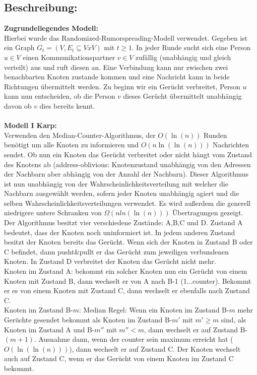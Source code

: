 \documentclass[12pt,a4paper]{report}
\begin{document}
\subsection*{Beschreibung:}
\textbf{Zugrundeliegendes Modell:}\\
 Hierbei wurde das Randomized-Rumorspreading-Modell verwendet. Gegeben ist ein Graph $G_t=(V,E_t \subseteq VxV)$ mit $t \ge 1$. In jeder Runde sucht sich eine Person $u \in V$ einen Kommunikationspartner $v \in V$ zufällig (unabhängig und gleich verteilt) aus und ruft diesen an. Eine Verbindung kann nur zwischen zwei benachbarten Knoten zustande kommen und eine Nachricht kann in beide Richtungen übermittelt werden. Zu beginn wir ein Gerücht verbreitet, Person $u$ kann nun entscheiden, ob die Person $v$ dieses Gerücht übermittelt unabhängig davon ob $v$ dies bereits kennt.\\
\\
\textbf{Modell I Karp:}\\
Verwenden den Median-Counter-Algorithmus, der $O(\ln(n))$ Runden benötigt um alle Knoten zu informieren und $O(n\ln(\ln(n)))$ Nachrichten sendet. Ob nun ein Knoten das Gerücht verbreitet oder nicht hängt vom Zustand des Knotens ab (address-oblivious: Knotenzustand unabhängig von den Adressen der Nachbarn aber abhängig von der Anzahl der Nachbarn). Dieser Algorithmus ist nun unabhängig von der Wahrscheinlichkeitsverteilung mit welcher die Nachbarn ausgewählt werden, sofern jeder Knoten unabhängig agiert und die selben Wahrscheinlichkeitsverteilungen verwendet. Es wird außerdem die generell niedrigere untere Schranken von $\Omega (n ln(\ln(n)))$ Übertragungen gezeigt. Der Algorithmus besitzt vier verschiedene Zustände: A,B,C und D. Zustand A bedeutet, dass der Knoten noch uninformiert ist. In jedem anderen Zustand besitzt der Knoten bereits das Gerücht. Wenn sich der Knoten in Zustand B oder C befindet, dann pusht\&pullt er das Gerücht zum jeweiligen verbundenen Knoten. In Zustand D verbreitet der Knoten das Gerücht nicht mehr. \\
Knoten im Zustand A:
bekommt ein solcher Knoten nun ein Gerücht von einem Knoten mit Zustand B, dann wechselt er von A nach B-1 (1...counter). Bekommt er es von einem Knoten mit Zustand C, dann wechselt er ebenfalls nach Zustand C.\\
Knoten im Zustand B-$m$: Median Regel: Wenn ein Knoten im Zustand B-$m$ mehr Gerüchte gesendet bekommt als Knoten im Zustand B-$m'$ mit $m' \ge m$ sind, als Knoten im Zustand A und B-$m''$ mit $m'' < m$, dann wechselt er auf Zustand B-$(m+1)$. Ausnahme dann, wenn der counter sein maximum erreicht hat ($O(\ln(\ln(n)))$), dann wechselt er auf Zustand C. Der Knoten wechselt auch auf Zustand C, wenn er das Gerücht von einem Knoten im Zustand C bekommt.\\
\end{document}
